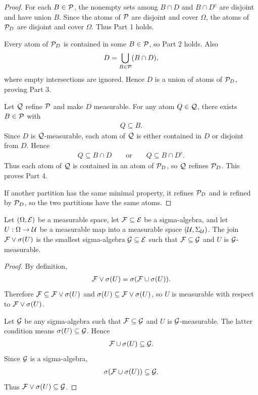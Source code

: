 \begin{proof}
For each $B\in\mathcal{P}$, the nonempty sets among $B\cap D$ and $B\cap D^c$ are disjoint and have union $B$. Since the atoms of $\mathcal{P}$ are disjoint and cover $\Omega$, the atoms of $\mathcal{P}_D$ are disjoint and cover $\Omega$. Thus Part 1 holds.

Every atom of $\mathcal{P}_D$ is contained in some $B\in\mathcal{P}$, so Part 2 holds. Also
\begin{align*}
D=\bigcup_{B\in\mathcal{P}}(B\cap D),
\end{align*}
where empty intersections are ignored. Hence $D$ is a union of atoms of $\mathcal{P}_D$, proving Part 3.

Let $\mathcal{Q}$ refine $\mathcal{P}$ and make $D$ measurable. For any atom $Q\in\mathcal{Q}$, there exists $B\in\mathcal{P}$ with
\begin{align*}
Q\subseteq B.
\end{align*}
Since $D$ is $\mathcal{Q}$-measurable, each atom of $\mathcal{Q}$ is either contained in $D$ or disjoint from $D$. Hence
\begin{align*}
Q\subseteq B\cap D\qquad \text{or}\qquad Q\subseteq B\cap D^c.
\end{align*}
Thus each atom of $\mathcal{Q}$ is contained in an atom of $\mathcal{P}_D$, so $\mathcal{Q}$ refines $\mathcal{P}_D$. This proves Part 4.

If another partition has the same minimal property, it refines $\mathcal{P}_D$ and is refined by $\mathcal{P}_D$, so the two partitions have the same atoms.
\end{proof}

\begin{theorem}
\label{thm:sigma-refinement:formal}
Let $(\Omega,\mathcal{E})$ be a measurable space, let $\mathcal{F}\subseteq\mathcal{E}$ be a sigma-algebra, and let $U:\Omega\to\mathcal{U}$ be a measurable map into a measurable space $(\mathcal{U},\Sigma_{\mathcal{U}})$. The join $\mathcal{F}\vee\sigma(U)$ is the smallest sigma-algebra $\mathcal{G}\subseteq\mathcal{E}$ such that $\mathcal{F}\subseteq\mathcal{G}$ and $U$ is $\mathcal{G}$-measurable.
\end{theorem}
\begin{proof}
By definition,
\begin{align*}
\mathcal{F}\vee\sigma(U)=\sigma(\mathcal{F}\cup\sigma(U)).
\end{align*}
Therefore $\mathcal{F}\subseteq\mathcal{F}\vee\sigma(U)$ and $\sigma(U)\subseteq\mathcal{F}\vee\sigma(U)$, so $U$ is measurable with respect to $\mathcal{F}\vee\sigma(U)$.

Let $\mathcal{G}$ be any sigma-algebra such that $\mathcal{F}\subseteq\mathcal{G}$ and $U$ is $\mathcal{G}$-measurable. The latter condition means $\sigma(U)\subseteq\mathcal{G}$. Hence
\begin{align*}
\mathcal{F}\cup\sigma(U)\subseteq\mathcal{G}.
\end{align*}
Since $\mathcal{G}$ is a sigma-algebra,
\begin{align*}
\sigma(\mathcal{F}\cup\sigma(U))\subseteq\mathcal{G}.
\end{align*}
Thus $\mathcal{F}\vee\sigma(U)\subseteq\mathcal{G}$.
\end{proof}


